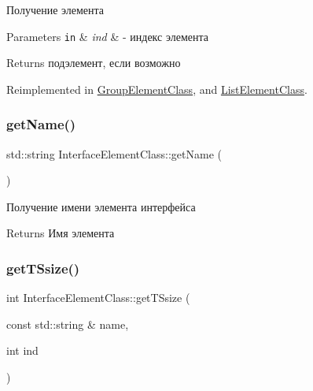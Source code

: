 Получение элемента 


\begin{DoxyParams}[1]{Parameters}
\mbox{\tt in}  & {\em ind} & -\/ индекс элемента \\
\hline
\end{DoxyParams}
\begin{DoxyReturn}{Returns}
подэлемент, если возможно 
\end{DoxyReturn}


Reimplemented in \hyperlink{class_group_element_class_ac30e4152465fa8409dfe3bf38e75cce7}{Group\+Element\+Class}, and \hyperlink{class_list_element_class_aaec0cdf8ec3c6a2e9e92cbc33d366b65}{List\+Element\+Class}.

\mbox{\label{class_interface_element_class_a7815b1d9629ff4dc8a83c170dbb171fc}} 
\subsubsection{\texorpdfstring{get\+Name()}{getName()}}
{\footnotesize\ttfamily std\+::string Interface\+Element\+Class\+::get\+Name (\begin{DoxyParamCaption}{ }\end{DoxyParamCaption})\hspace{0.3cm}{\ttfamily [inherited]}}



Получение имени элемента интерфейса 

\begin{DoxyReturn}{Returns}
Имя элемента 
\end{DoxyReturn}
\mbox{\label{class_interface_element_class_ac7b96d7196906f80b377e293cc36404c}} 
\subsubsection{\texorpdfstring{get\+T\+Ssize()}{getTSsize()}}
{\footnotesize\ttfamily int Interface\+Element\+Class\+::get\+T\+Ssize (\begin{DoxyParamCaption}\item[{const std\+::string \&}]{name,  }\item[{int}]{ind }\end{DoxyParamCaption})\hspace{0.3cm}{\ttfamily [inherited]}}

